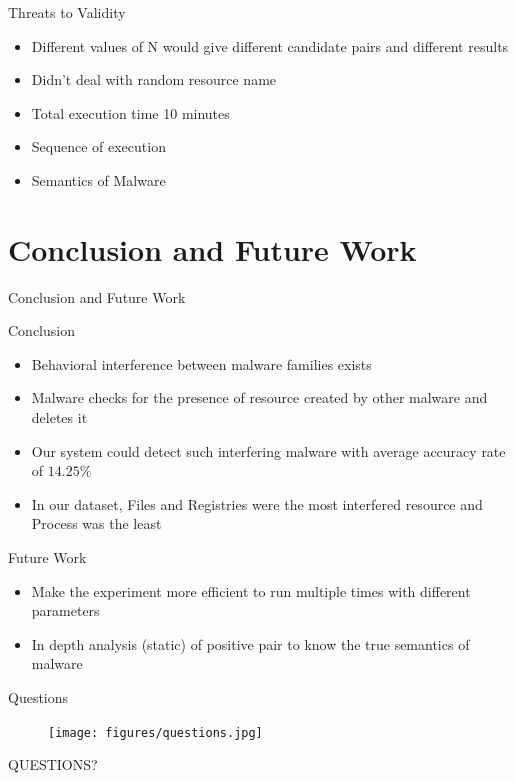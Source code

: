 \documentclass{beamer}
\begin{document}
\begin{frame}[h]{Threats to Validity}
  \begin{itemize}
    \item Different values of N would give different candidate pairs and different results
    \item Didn't deal with random resource name
    \item Total execution time 10 minutes
    \item Sequence of execution
    \item Semantics of Malware
  \end{itemize}
\end{frame}

\section{Conclusion and Future Work}
\begin{frame}{Conclusion and Future Work}
  \begin{block}{Conclusion}
  \begin{itemize}
    \item Behavioral interference between malware families exists
    \item Malware checks for the presence of resource created by other malware and deletes it
    \item Our system could detect such interfering malware with average accuracy rate of $14.25\%$
    \item In our dataset, Files and Registries were the most interfered resource and Process was the least
  \end{itemize}
  \end{block}
  \begin{block}{Future Work}
  \begin{itemize}
    \item Make the experiment more efficient to run multiple times with different parameters
    \item In depth analysis (static) of positive pair to know the true semantics of malware
  \end{itemize}
  \end{block}
\end{frame}
\begin{frame}[plain,c]{Questions}
  \begin{figure}[H]
    \centering
    \texttt{[image: figures/questions.jpg]}
  \end{figure}
  \begin{center}
    \Huge QUESTIONS?\@
  \end{center}
\end{frame}
\end{document}

